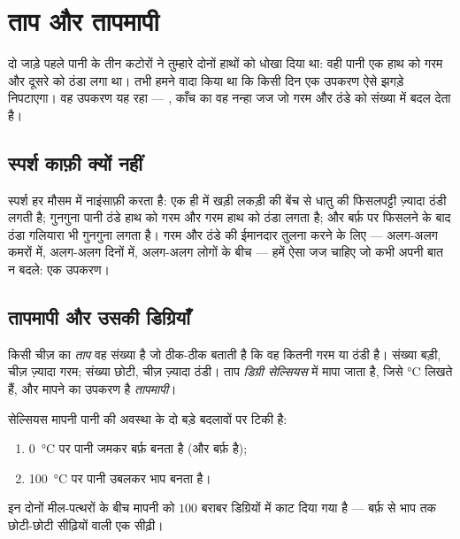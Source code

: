\chapter{ताप और तापमापी}\label{ch:g3:temperature-thermometers}

दो जाड़े पहले पानी के तीन कटोरों ने तुम्हारे दोनों हाथों को धोखा दिया
था: वही पानी एक हाथ को गरम और दूसरे को ठंडा लगा था। तभी हमने वादा
किया था कि किसी दिन एक उपकरण ऐसे झगड़े निपटाएगा। वह उपकरण यह रहा ---
, काँच का वह नन्हा जज जो गरम और ठंडे को संख्या में बदल देता
है।

\section{स्पर्श काफ़ी क्यों नहीं}

\begin{example}[नाइंसाफ़ जज]\label{ex:g3:temperature-thermometers:unfair}
स्पर्श हर मौसम में नाइंसाफ़ी करता है: एक ही  में खड़ी लकड़ी की
बेंच से धातु की फिसलपट्टी ज़्यादा ठंडी लगती है; गुनगुना पानी ठंडे हाथ
को गरम और गरम हाथ को ठंडा लगता है; और बर्फ़ पर फिसलने के बाद ठंडा
गलियारा भी गुनगुना लगता है। गरम और ठंडे की ईमानदार तुलना करने के लिए
--- अलग-अलग कमरों में, अलग-अलग दिनों में, अलग-अलग लोगों के बीच ---
हमें ऐसा जज चाहिए जो कभी अपनी बात न बदले: एक उपकरण।
\end{example}

\section{तापमापी और उसकी डिग्रियाँ}

\begin{definition}[ताप]\label{def:g3:temperature-thermometers:temperature}
किसी चीज़ का \emph{ताप} वह संख्या है जो ठीक-ठीक बताती है
कि वह कितनी गरम या ठंडी है। संख्या बड़ी, चीज़ ज़्यादा गरम; संख्या
छोटी, चीज़ ज़्यादा ठंडी। ताप \emph{डिग्री सेल्सियस} में मापा जाता है, जिसे \unit{\celsius} लिखते हैं, और मापने
का उपकरण है \emph{तापमापी}।
\end{definition}

\begin{proposition}[पानी के दो मील-पत्थर]\label{prop:g3:temperature-thermometers:milestones}
सेल्सियस मापनी पानी की अवस्था के दो बड़े बदलावों पर टिकी है:
\begin{enumerate}
  \item \qty{0}{\celsius} पर पानी जमकर बर्फ़ बनता है (और बर्फ़
         है);
  \item \qty{100}{\celsius} पर पानी उबलकर भाप बनता है।
\end{enumerate}
इन दोनों मील-पत्थरों के बीच मापनी को $100$ बराबर डिग्रियों में काट
दिया गया है --- बर्फ़ से भाप तक छोटी-छोटी सीढ़ियों वाली एक सीढ़ी।
\end{proposition}

